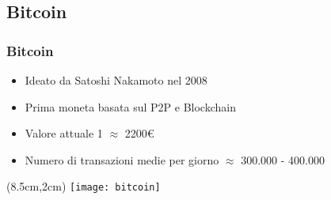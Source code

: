 \subsection{Bitcoin}
\begin{frame}
 \frametitle{Bitcoin}

 \begin{itemize}
  \item<1-> Ideato da Satoshi Nakamoto nel 2008
  \item<2-> Prima moneta basata sul P2P e Blockchain%
  \item<3-> Valore attuale 1\bitcoin{} $ \approx $  2200\euro{}
  \item<4-> Numero di transazioni medie per giorno $ \approx $ 300.000 - 400.000
 \end{itemize}



 \begin{textblock*}{5cm}(8.5cm,2cm)
  \texttt{[image: bitcoin]}
 \end{textblock*}

\end{frame}
